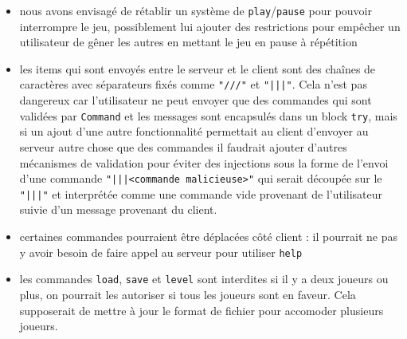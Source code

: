 \documentclass[a4paper,french]{article}
\newcommand{\ttt}[1]{\texttt{#1}}
\begin{document}
\begin{itemize}
    \item nous avons envisag\'e de r\'etablir un syst\`eme de \ttt{play}/\ttt{pause} pour pouvoir interrompre le jeu,
        possiblement lui ajouter des restrictions pour emp\^echer un utilisateur de g\^ener les autres en mettant le
        jeu en pause \`a r\'ep\'etition
    \item les items qui sont envoy\'es entre le serveur et le client sont des cha\^ines de caract\`eres avec s\'eparateurs
        fix\'es comme \ttt{"///"} et \ttt{"|||"}. Cela n'est pas dangereux car l'utilisateur ne peut envoyer
        que des commandes qui sont valid\'ees par \ttt{Command} et les messages sont encapsul\'es dans un block \ttt{try},
        mais si un ajout d'une autre fonctionnalit\'e permettait au client d'envoyer au serveur autre chose que des commandes
        il faudrait ajouter d'autres m\'ecanismes de validation pour \'eviter des injections sous la forme de l'envoi
        d'une commande \ttt{"|||<commande malicieuse>"} qui serait d\'ecoup\'ee sur le \ttt{"|||"} et interpr\'et\'ee
        comme une commande vide provenant de l'utilisateur suivie d'un message provenant du client.
    \item certaines commandes pourraient \^etre d\'eplac\'ees c\^ot\'e client : il pourrait ne pas y avoir besoin de faire
        appel au serveur pour utiliser \ttt{help}
    \item les commandes \ttt{load}, \ttt{save} et \ttt{level} sont interdites si il y a deux joueurs ou plus, on pourrait les
        autoriser si tous les joueurs sont en faveur. Cela supposerait de mettre \`a jour le
        format de fichier pour accomoder plusieurs joueurs.
\end{itemize}
\end{document}

